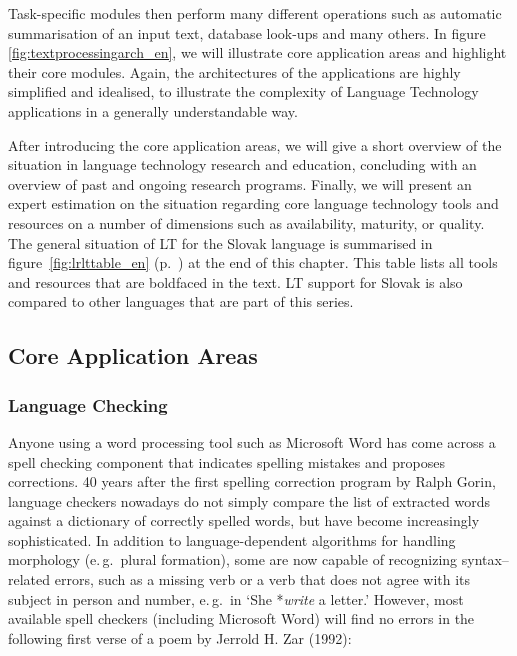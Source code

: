 \begin{multicols}{2}
Task-specific modules then perform many different operations such as
automatic summarisation of an input text, database look-ups and many
others. In figure \ref{fig:textprocessingarch_en}, we will
illustrate core application areas and highlight their core modules.
Again, the architectures of the applications are highly simplified and
idealised, to illustrate the complexity of Language Technology
applications in a generally understandable way.

After introducing the core application areas, we will give a short
overview of the situation in language technology research and education,
concluding with an overview of past and ongoing research programs.
Finally, we will present an expert estimation on the
situation regarding core language technology tools and resources on a
number of dimensions such as availability, maturity, or quality. The general situation of LT for the Slovak language is summarised in figure~\ref{fig:lrlttable_en} (p.~\pageref{fig:lrlttable_en}) at the end of this chapter. This table lists all tools and resources that are boldfaced in the text. LT support for Slovak is also compared to other languages that are part of this series.


\subsection{Core Application Areas}
\subsubsection{Language Checking}
Anyone using a word processing tool such as Microsoft Word has come across a spell checking component that indicates spelling mistakes and proposes corrections. 40 years after the first spelling correction program by Ralph Gorin, language checkers nowadays do not simply compare the list of extracted words against a dictionary of correctly spelled words, but have become increasingly sophisticated. In addition to language-dependent algorithms for handling morphology (e.\,g.~plural formation), some are now capable of recognizing syntax–related errors, such as a missing verb or a verb that does not agree with its subject in person and number, e.\,g.~in ‘She *\emph{write} a letter.’ However, most available spell checkers (including Microsoft Word) will find no errors in the following first verse of a poem by Jerrold H. Zar (1992)\cite{f22}: 


\end{multicols}
